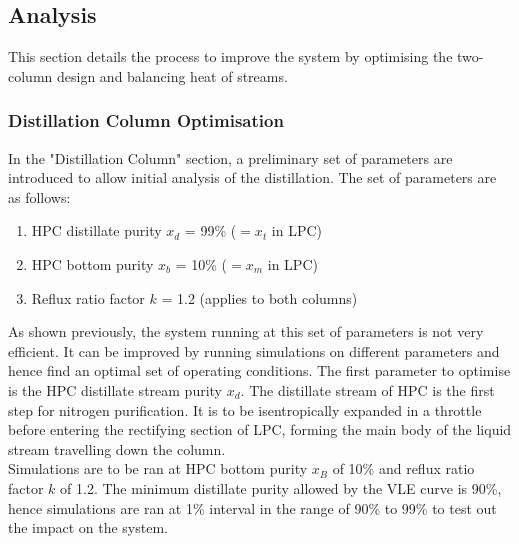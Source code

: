 \subsection{Analysis} \noindent
This section details the process to improve the system by optimising the two-column design and balancing heat of streams.
	\subsubsection{Distillation Column Optimisation} \noindent
	In the "Distillation Column" section, a preliminary set of parameters are introduced to allow initial analysis of the distillation. The set of parameters are as follows:
    \begin{enumerate}
        \item HPC distillate purity $x_d$ = 99\% ($=x_t$ in LPC)
        \item HPC bottom purity $x_b$ = 10\% ($=x_m$ in LPC)
        \item Reflux ratio factor $k$ = 1.2 (applies to both columns)
    \end{enumerate}
    As shown previously, the system running at this set of parameters is not very efficient. It can be improved by running simulations on different parameters and hence find an optimal set of operating conditions.
    The first parameter to optimise is the HPC distillate stream purity $x_d$. The distillate stream of HPC is the first step for nitrogen purification. It is to be isentropically expanded in a throttle before entering the rectifying section of LPC, forming the main body of the liquid stream travelling down the column. \\
    Simulations are to be ran at HPC bottom purity $x_B$ of 10\% and reflux ratio factor $k$ of 1.2. The minimum distillate purity allowed by the VLE curve is 90\%, hence simulations are ran at 1\% interval in the range of 90\% to 99\% to test out the impact on the system. \\
    
